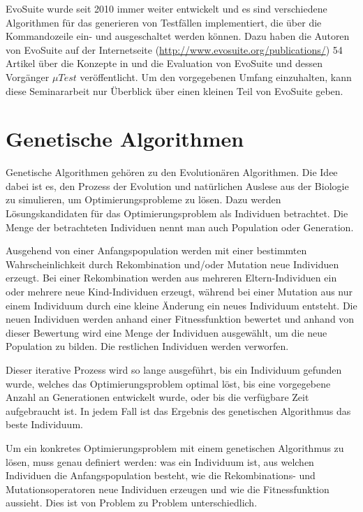 \documentclass[a4paper,11pt]{article}
\begin{document}
EvoSuite wurde seit 2010 immer weiter entwickelt und es sind verschiedene Algorithmen für das generieren von Testfällen implementiert, die über die Kommandozeile ein- und ausgeschaltet werden können.
Dazu haben die Autoren von EvoSuite auf der Internetseite (\url{http://www.evosuite.org/publications/}) 54 Artikel über die Konzepte in und die Evaluation von EvoSuite und dessen Vorgänger ${\mu}Test$ veröffentlicht.
Um den vorgegebenen Umfang einzuhalten, kann diese Seminararbeit nur Überblick über einen kleinen Teil von EvoSuite geben.

\section{Genetische Algorithmen}
\label{sec:genetische_algorithmen}

Genetische Algorithmen gehören zu den Evolutionären Algorithmen.
Die Idee dabei ist es, den Prozess der Evolution und natürlichen Auslese aus der Biologie zu simulieren, um Optimierungsprobleme zu lösen.
Dazu werden Lösungskandidaten für das Optimierungsproblem als Individuen betrachtet.
Die Menge der betrachteten Individuen nennt man auch Population oder Generation.

Ausgehend von einer Anfangspopulation werden mit einer bestimmten Wahrscheinlichkeit durch Rekombination und/oder Mutation neue Individuen erzeugt.
Bei einer Rekombination werden aus mehreren Eltern-Individuen ein oder mehrere neue Kind-Individuen erzeugt, während bei einer Mutation aus nur einem Individuum durch eine kleine Änderung ein neues Individuum entsteht.
Die neuen Individuen werden anhand einer Fitnessfunktion bewertet und anhand von dieser Bewertung wird eine Menge der Individuen ausgewählt, um die neue Population zu bilden.
Die restlichen Individuen werden verworfen.

Dieser iterative Prozess wird so lange ausgeführt, bis ein Individuum gefunden wurde, welches das Optimierungsproblem optimal löst, bis eine vorgegebene Anzahl an Generationen entwickelt wurde, oder bis die verfügbare Zeit aufgebraucht ist.
In jedem Fall ist das Ergebnis des genetischen Algorithmus das beste Individuum.

Um ein konkretes Optimierungsproblem mit einem genetischen Algorithmus zu lösen, muss genau definiert werden: was ein Individuum ist, aus welchen Individuen die Anfangspopulation besteht, wie die Rekombinations- und Mutationsoperatoren neue Individuen erzeugen und wie die Fitnessfunktion aussieht.
Dies ist von Problem zu Problem unterschiedlich.
\end{document}
